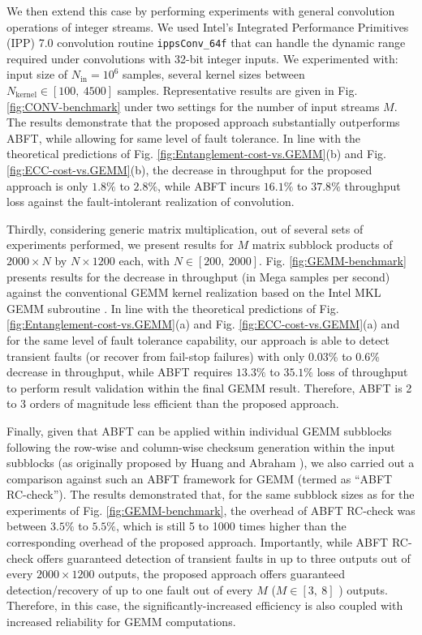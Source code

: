 \documentclass[twocolumn,english,onecolumn]{IEEEtran}
\theoremstyle{plain}
\theoremstyle{plain}
\begin{document}
We then extend this case by performing experiments with general convolution
operations of integer streams. We used Intel's Integrated Performance
Primitives (IPP) 7.0 \cite{taylor2003intel} convolution routine \texttt{ippsConv\_64f}
that can handle the dynamic range required under convolutions with
32-bit integer inputs. We experimented with: input size of $N_{\text{in}}=10^{6}$
samples, several kernel sizes between $N_{\text{kernel}}\in\left[100,\:4500\right]$
samples. Representative results are given in Fig. \ref{fig:CONV-benchmark}
under two settings for the number of input streams $M$. The results
demonstrate that the proposed approach substantially outperforms ABFT,
while allowing for same level of fault tolerance. In line with the
theoretical predictions of Fig. \ref{fig:Entanglement-cost-vs.GEMM}(b)
and Fig. \ref{fig:ECC-cost-vs.GEMM}(b), the decrease in throughput
for the proposed approach is only $1.8\%$ to $2.8\%$, while ABFT
incurs $16.1\%$ to $37.8\%$ throughput loss against the fault-intolerant
realization of convolution. 

Thirdly, considering generic matrix multiplication, out of several
sets of experiments performed, we present results for $M$ matrix
subblock products of $2000\times N$ by $N\times1200$ each, with
$N\in\left[200,\:2000\right]$. Fig. \ref{fig:GEMM-benchmark} presents
results for the decrease in throughput (in Mega samples per second)
against the conventional GEMM kernel realization based on the Intel
MKL GEMM subroutine \cite{intel2007intel}. In line with the theoretical
predictions of Fig. \ref{fig:Entanglement-cost-vs.GEMM}(a) and Fig.
\ref{fig:ECC-cost-vs.GEMM}(a) and for the same level of fault tolerance
capability, our approach is able to detect transient faults (or recover
from fail-stop failures) with only 0.03\% to 0.6\% decrease in throughput,
while ABFT requires $13.3\%$ to $35.1\%$ loss of throughput to perform
result validation within the final GEMM result. Therefore, ABFT is
2 to 3 orders of magnitude less efficient than the proposed approach. 

Finally, given that ABFT can be applied within individual GEMM subblocks
following the row-wise and column-wise checksum generation within
the input subblocks (as originally proposed by Huang and Abraham \cite{huang1984algorithm}),
we also carried out a comparison against such an ABFT framework for
GEMM (termed as ``ABFT RC-check''). The results demonstrated that,
for the same subblock sizes as for the experiments of Fig. \ref{fig:GEMM-benchmark},
the overhead of ABFT RC-check was between $3.5\%$ to $5.5\%$, which
is still 5 to 1000 times higher than the corresponding overhead of
the proposed approach. Importantly, while ABFT RC-check offers guaranteed
detection of transient faults in up to three outputs out of every
$2000\times1200$ outputs, the proposed approach offers guaranteed
detection/recovery of up to one fault out of every $M$ ($M\in\left[3,\:8\right]$
) outputs. Therefore, in this case, the significantly-increased efficiency
is also coupled with increased reliability for GEMM computations. 
\end{document}
